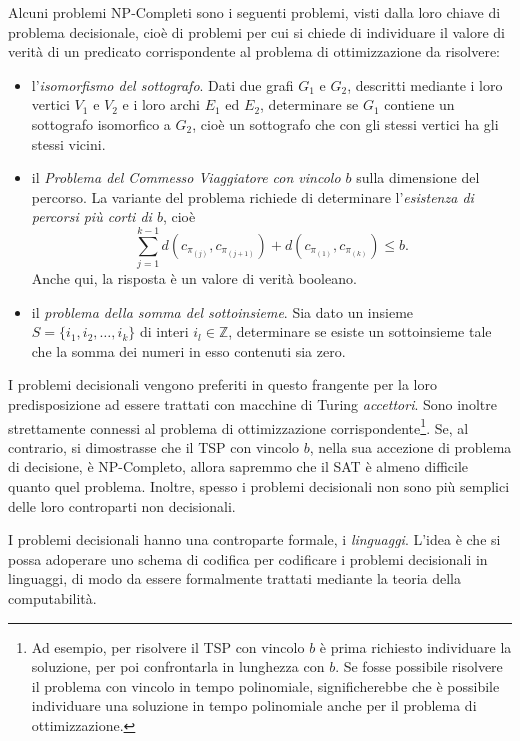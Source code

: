 \documentclass[10pt]{\classname}
\theoremstyle{newlinethm}
\theoremstyle{theorem}
\theoremstyle{definition}
\theoremstyle{definition}
\theoremstyle{definition}
\theoremstyle{definition}
\begin{document}
Alcuni problemi NP-Completi sono i seguenti problemi, visti dalla loro chiave di problema decisionale, cioè di problemi per cui si chiede di individuare il valore di verità di un predicato corrispondente al problema di ottimizzazione da risolvere:
\begin{itemize}
    \item l'\emph{isomorfismo del sottografo}. Dati due grafi $G_1$ e $G_2$, descritti mediante i loro vertici $V_1$ e $V_2$ e i loro archi $E_1$ ed $E_2$, determinare se $G_1$ contiene un sottografo isomorfico a $G_2$, cioè un sottografo che con gli stessi vertici ha gli stessi vicini.
    \item il \emph{Problema del Commesso Viaggiatore con vincolo $b$} sulla dimensione del percorso. La variante del problema richiede di determinare l'\emph{esistenza di percorsi più corti di $b$}, cioè \[\sum_{j=1}^{k-1} d(c_{\pi_{(j)}}, c_{\pi_{(j+1)}}) + d(c_{\pi_{(1)}},c_{\pi_{(k)}}) \leq b.\] Anche qui, la risposta è un valore di verità booleano.
    \item il \emph{problema della somma del sottoinsieme}. Sia dato un insieme $S=\{i_1, i_2, \dots, i_k\}$ di interi $i_l \in \mathbb{Z}$, determinare se esiste un sottoinsieme tale che la somma dei numeri in esso contenuti sia zero.
\end{itemize}
I problemi decisionali vengono preferiti in questo frangente per la loro predisposizione ad essere trattati con macchine di Turing \emph{accettori}. Sono inoltre strettamente connessi al problema di ottimizzazione corrispondente\footnote{Ad esempio, per risolvere il TSP con vincolo $b$ è prima richiesto individuare la soluzione, per poi confrontarla in lunghezza con $b$. Se fosse possibile risolvere il problema con vincolo in tempo polinomiale, significherebbe che è possibile individuare una soluzione in tempo polinomiale anche per il problema di ottimizzazione.}. Se, al contrario, si dimostrasse che il TSP con vincolo $b$, nella sua accezione di problema di decisione, è NP-Completo, allora sapremmo che il SAT è almeno difficile quanto quel problema. Inoltre, spesso i problemi decisionali non sono più semplici delle loro controparti non decisionali.

I problemi decisionali hanno una controparte formale, i \emph{linguaggi}. L'idea è che si possa adoperare uno schema di codifica per codificare i problemi decisionali in linguaggi, di modo da essere formalmente trattati mediante la teoria della computabilità.
\end{document}
